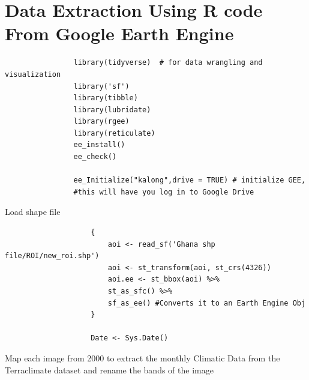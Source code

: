 \documentclass[12pt,a4paper]{book}
\begin{document}
	\section{Data Extraction Using R code From Google Earth Engine}
			\begin{shaded}
				\begin{verbatim}
				library(tidyverse)  # for data wrangling and visualization
				library('sf')
				library(tibble)
				library(lubridate)						
				library(rgee)			
				library(reticulate)
				ee_install()
				ee_check()
				
				ee_Initialize("kalong",drive = TRUE) # initialize GEE,
				#this will have you log in to Google Drive
				\end{verbatim}
			\end{shaded}
				
			Load shape file
			\begin{shaded}
				\begin{verbatim}
					{
						aoi <- read_sf('Ghana shp file/ROI/new_roi.shp')
						aoi <- st_transform(aoi, st_crs(4326))
						aoi.ee <- st_bbox(aoi) %>%
						st_as_sfc() %>%
						sf_as_ee() #Converts it to an Earth Engine Obj
					}			
					
					Date <- Sys.Date()
				\end{verbatim}
			\end{shaded}
			Map each image from 2000 to extract the monthly Climatic Data from the
			 Terraclimate dataset and rename the bands of the image
			
\end{document}
